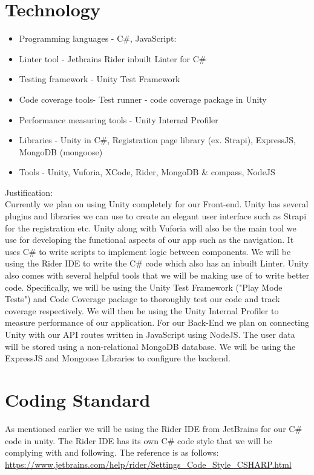 \documentclass{article}
\begin{document}
\section{Technology}

\begin{itemize}
  \item Programming languages - C\#, JavaScript:
  \item Linter tool - Jetbrains Rider inbuilt Linter for C\#
  \item Testing framework - Unity Test Framework
  \item Code coverage tools- Test runner - code coverage package in Unity
  \item Performance measuring tools - Unity Internal Profiler
  \item Libraries - Unity in C\#, Registration page library (ex. Strapi), ExpressJS, MongoDB (mongoose) 
  \item Tools - Unity, Vuforia, XCode, Rider, MongoDB \& compass, NodeJS
  \end{itemize}
  Justification: \\
  Currently we plan on using Unity completely for our Front-end. Unity has several plugins and libraries  we can use to create an elegant user interface such as Strapi for the registration etc. Unity along with Vuforia will also be the main tool we use for developing the functional aspects of our app such as the navigation. It uses C\# to write scripts to implement logic between components. We will be using the Rider IDE to write the C\# code which also has an inbuilt Linter. Unity also comes with several helpful tools that we will be making use of to write better code. Specifically, we will be using the Unity Test Framework ("Play Mode Tests") and Code Coverage package to thoroughly test our code and track coverage respectively. We will then be using the Unity Internal Profiler to measure performance of our application. For our Back-End we plan on connecting Unity with our API routes written in JavaScript using NodeJS. The user data will be stored using a non-relational MongoDB database. We will be using the ExpressJS and Mongoose Libraries to configure the backend. 

\section{Coding Standard}

As mentioned earlier we will be using the Rider IDE from JetBrains for our C\# code in unity. The Rider IDE has its own C\# code style that we will be complying with and following. The reference is as follows: \\
\url{https://www.jetbrains.com/help/rider/Settings_Code_Style_CSHARP.html}
\end{document}

